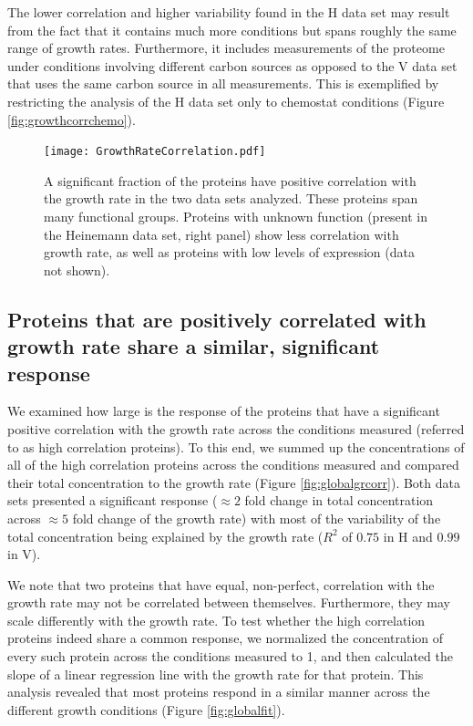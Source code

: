 \documentclass[a4paper,landscape,titlepage,17pt]{extarticle}
\begin{document}
The lower correlation and higher variability found in the H data set may result from the fact that it contains much more conditions but spans roughly the same range of growth rates.
Furthermore, it includes measurements of the proteome under conditions involving different carbon sources as opposed to the V data set that uses the same carbon source in all measurements.
This is exemplified by restricting the analysis of the H data set only to chemostat conditions (Figure \ref{fig:growthcorrchemo}).

\begin{figure}[h]
\centering
\texttt{[image: GrowthRateCorrelation.pdf]}
\caption{\linespread{0.5}\selectfont{}
A significant fraction of the proteins have positive correlation with the growth rate in the two data sets analyzed.
These proteins span many functional groups.
Proteins with unknown function (present in the Heinemann data set, right panel) show less correlation with growth rate, as well as proteins with low levels of expression (data not shown).
}
\label{fig:growthcorr}
\end{figure}

\clearpage        
\subsection*{Proteins that are positively correlated with growth rate share a similar, significant response}
We examined how large is the response of the proteins that have a significant positive correlation with the growth rate across the conditions measured (referred to as high correlation proteins).
To this end, we summed up the concentrations of all of the high correlation proteins across the conditions measured and compared their total concentration to the growth rate (Figure \ref{fig:globalgrcorr}).
Both data sets presented a significant response ($\approx 2$ fold change in total concentration across $\approx 5$ fold change of the growth rate) with most of the variability of the total concentration being explained by the growth rate ($R^2$ of $0.75$ in H and $0.99$ in V). 

We note that two proteins that have equal, non-perfect, correlation with the growth rate may not be correlated between themselves.
Furthermore, they may scale differently with the growth rate.
To test whether the high correlation proteins indeed share a common response, we normalized the concentration of every such protein across the conditions measured to 1, and then calculated the slope of a linear regression line with the growth rate for that protein.
This analysis revealed that most proteins respond in a similar manner across the different growth conditions (Figure \ref{fig:globalfit}).
\end{document}
